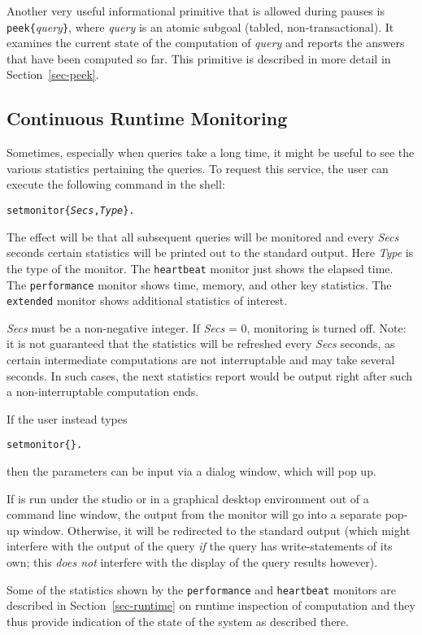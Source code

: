  Another very useful informational primitive that is allowed during pauses is
  \texttt{peek\{}\emph{query}\texttt{\}}, where \emph{query} is an atomic
  subgoal (tabled, non-transactional). It examines the current state of
  the computation of \emph{query} and reports the answers that have 
  been computed so far. This primitive is described in more detail in
  Section~\ref{sec-peek}.

\subsection{Continuous Runtime Monitoring}\label{sec-monitor}

Sometimes, especially when queries take a long time, it might be useful to see
the various statistics pertaining the queries. To request this service, the
user can execute the following command in the \FLSYSTEM shell:
\begin{alltt}
   \prompt setmonitor\{\emph{Secs},\emph{Type}\}. 
\end{alltt}
The effect will be that all subsequent queries will be monitored and every
\emph{Secs} seconds certain statistics will be printed out to the standard
output. Here \textit{Type} is the type of
the monitor. The \texttt{heartbeat} monitor just shows the elapsed time.
The \texttt{performance} monitor shows time, memory, and other
key statistics. The \texttt{extended} monitor shows additional
statistics of interest.

\emph{Secs} must be a non-negative integer. If \emph{Secs} = 0, monitoring
is turned off.  Note: it is not guaranteed that the statistics will be
refreshed every \emph{Secs} seconds, as certain intermediate
computations are not
interruptable and may take several seconds. In such cases, the next
statistics report would be output right after such a non-interruptable
computation ends.

If the user instead types
\begin{alltt}
   \prompt setmonitor\{\}. 
\end{alltt}
then the parameters can be input via a dialog window, which will pop up.

If \ERGO is run under the studio or in a graphical desktop environment out
of a command line window, the output from the monitor will go into a
separate pop-up window. Otherwise, it will be redirected to the standard
output (which might
interfere with the output of the query \emph{if}  the query has
write-statements of its own; this \emph{does not} interfere with the
display of the query results however).

Some of the statistics shown by the \texttt{performance} and
\texttt{heartbeat} monitors are described in Section~\ref{sec-runtime} on
runtime inspection of computation and they thus provide indication
of the state of the system as described there.

